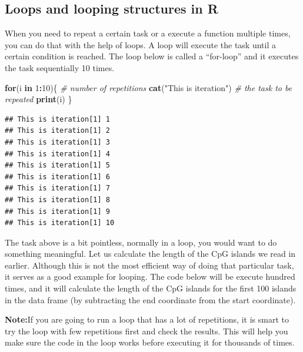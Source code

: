 \documentclass[12pt,]{krantz}
\newenvironment{Shaded}{\begin{snugshade}}{\end{snugshade}}
\newcommand{\CommentTok}[1]{\textcolor[rgb]{0.56,0.35,0.01}{\textit{#1}}}
\newcommand{\ControlFlowTok}[1]{\textcolor[rgb]{0.13,0.29,0.53}{\textbf{#1}}}
\newcommand{\DecValTok}[1]{\textcolor[rgb]{0.00,0.00,0.81}{#1}}
\newcommand{\KeywordTok}[1]{\textcolor[rgb]{0.13,0.29,0.53}{\textbf{#1}}}
\newcommand{\NormalTok}[1]{#1}
\newcommand{\OperatorTok}[1]{\textcolor[rgb]{0.81,0.36,0.00}{\textbf{#1}}}
\newcommand{\StringTok}[1]{\textcolor[rgb]{0.31,0.60,0.02}{#1}}
\begin{document}
\hypertarget{loops-and-looping-structures-in-r}{%
\subsection{Loops and looping structures in R}\label{loops-and-looping-structures-in-r}}

When you need to repeat a certain task or a execute a function multiple times, you can do that with the help of loops. A loop will execute the task until a certain condition is reached. The loop below is called a ``for-loop'' and it executes the task sequentially 10 times.

\begin{Shaded}
\begin{Highlighting}[]
\ControlFlowTok{for}\NormalTok{(i }\ControlFlowTok{in} \DecValTok{1}\OperatorTok{:}\DecValTok{10}\NormalTok{)\{ }\CommentTok{# number of repetitions}
\KeywordTok{cat}\NormalTok{(}\StringTok{"This is iteration"}\NormalTok{) }\CommentTok{# the task to be repeated}
\KeywordTok{print}\NormalTok{(i)}
\NormalTok{\}}
\end{Highlighting}
\end{Shaded}

\begin{verbatim}
## This is iteration[1] 1
## This is iteration[1] 2
## This is iteration[1] 3
## This is iteration[1] 4
## This is iteration[1] 5
## This is iteration[1] 6
## This is iteration[1] 7
## This is iteration[1] 8
## This is iteration[1] 9
## This is iteration[1] 10
\end{verbatim}

The task above is a bit pointless, normally in a loop, you would want to do something meaningful. Let us calculate the length of the CpG islands we read in earlier. Although this is not the most efficient way of doing that particular task, it serves as a good example for looping. The code below will be execute hundred times, and it will calculate the length of the CpG islands for the first 100 islands in
the data frame (by subtracting the end coordinate from the start coordinate).

\textbf{Note:}If you are going to run a loop that has a lot of repetitions, it is smart to try the loop with few repetitions first and check the results. This will help you make sure the code in the loop works before executing it for thousands of times.
\end{document}
